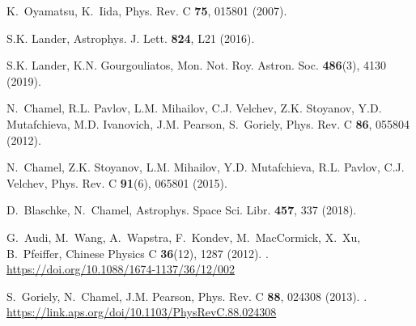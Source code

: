 \documentclass[epj]{svjour}
\begin{document}
\begin{thebibliography}{10}
K.~Oyamatsu, K.~Iida, Phys. Rev. C \textbf{75}, 015801 (2007).
\newblock {}

S.K. Lander, Astrophys. J. Lett. \textbf{824}, L21 (2016).
\newblock {}

S.K. Lander, K.N. Gourgouliatos, Mon. Not. Roy. Astron. Soc. \textbf{486}(3),
  4130 (2019).
\newblock {}

N.~Chamel, R.L. Pavlov, L.M. Mihailov, C.J. Velchev, Z.K. Stoyanov, Y.D.
  Mutafchieva, M.D. Ivanovich, J.M. Pearson, S.~Goriely, Phys. Rev. C
  \textbf{86}, 055804 (2012).
\newblock {}

N.~Chamel, Z.K. Stoyanov, L.M. Mihailov, Y.D. Mutafchieva, R.L. Pavlov, C.J.
  Velchev, Phys. Rev. C \textbf{91}(6), 065801 (2015).
\newblock {}

D.~Blaschke, N.~Chamel, Astrophys. Space Sci. Libr. \textbf{457}, 337 (2018).
\newblock {}

G.~Audi, M.~Wang, A.~Wapstra, F.~Kondev, M.~MacCormick, X.~Xu, B.~Pfeiffer,
  Chinese Physics C \textbf{36}(12), 1287 (2012).
\newblock {}.
\newblock \urlprefix\url{https://doi.org/10.1088/1674-1137/36/12/002}

S.~Goriely, N.~Chamel, J.M. Pearson, Phys. Rev. C \textbf{88}, 024308 (2013).
\newblock {}.
\newblock \urlprefix\url{https://link.aps.org/doi/10.1103/PhysRevC.88.024308}

\end{thebibliography}
\end{document}
